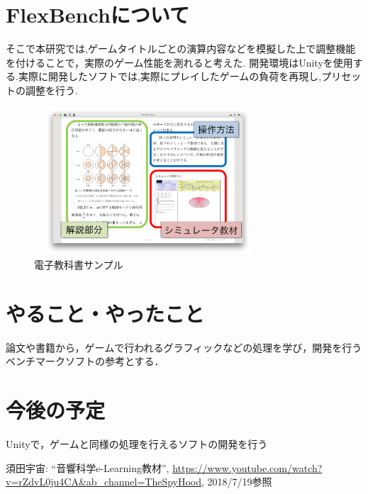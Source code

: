 \documentclass[twocolumn,10pt,a4j]{ltjsarticle}
\begin{document}
\section{FlexBenchについて}
そこで本研究では,ゲームタイトルごとの演算内容などを模擬した上で調整機能を付けることで，実際のゲーム性能を測れると考えた.
開発環境はUnityを使用する.実際に開発したソフトでは,実際にプレイしたゲームの負荷を再現し,プリセットの調整を行う.




\begin{figure}[h]
\begin{center}
 \includegraphics[clip,width=85mm,height=55mm]{textbook.pdf}
\end{center}
 \caption{電子教科書サンプル}
 \label{fig:教科書}
\end{figure}

\section{やること・やったこと}

論文や書籍から，ゲームで行われるグラフィックなどの処理を学び，開発を行うベンチマークソフトの参考とする．


\section{今後の予定}
Unityで，ゲームと同様の処理を行えるソフトの開発を行う

\begin{thebibliography}{99}
 須田宇宙: ``音響科学e-Learning教材'', \url{https://www.youtube.com/watch?v=rZdvL0ju4CA&ab_channel=TheSpyHood}, 2018/7/19参照
\end{thebibliography}
\end{document}
